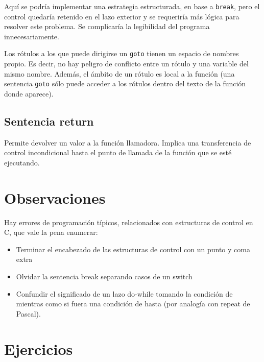 Aquí se podría implementar una estrategia estructurada, en base a \texttt{break}, pero
el control quedaría retenido en el lazo exterior y se requeriría más lógica
para resolver este problema. Se complicaría la legibilidad del programa
innecesariamente.

Los rótulos a los que puede dirigirse un \texttt{goto} tienen un espacio de nombres
propio. Es decir, no hay peligro de conflicto entre un rótulo y una variable
del mismo nombre. Además, el ámbito de un rótulo es local a la función (una
sentencia \texttt{goto} sólo puede acceder a los rótulos dentro del texto de la función
donde aparece).

\subsection{Sentencia return}
Permite devolver un valor a la función llamadora. Implica una transferencia de
control incondicional hasta el punto de llamada de la función que se esté
ejecutando.

\section{Observaciones}
Hay errores de programación típicos, relacionados con estructuras de control en
C, que vale la pena enumerar:
\begin{itemize}
	\item Terminar el encabezado de las estructuras de control con un punto y coma
      extra
    \item Olvidar la sentencia break separando casos de un switch
    \item Confundir el significado de un lazo do-while tomando la condición de
      mientras como si fuera una condición de hasta (por analogía con repeat de
      Pascal).
\end{itemize}
    
\section{Ejercicios}


